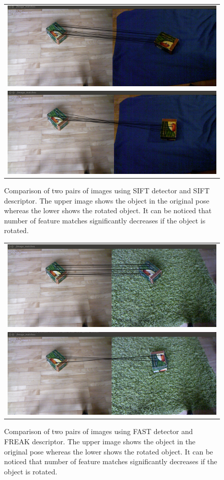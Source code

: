 \begin{figure}
    \begin{tabular}{c}
 

\includegraphics[width=0.7\columnwidth]{figures/sift-gpu-no-rotation.png}\\
\includegraphics[width=0.7\columnwidth]{figures/siftgpu-rotation.png}\\
    \end{tabular}


\caption{Comparison of two pairs of images using SIFT detector and SIFT descriptor. The upper image shows the object in the original pose whereas the lower shows the rotated object. It can be noticed that number of feature matches significantly decreases if the object is rotated. }
\label{fig:sift-features}
\end{figure}

\begin{figure}
    \begin{tabular}{c}
 

\includegraphics[width=0.7\columnwidth]{figures/freak-no-rotation.png}\\
\includegraphics[width=0.7\columnwidth]{figures/freak-rotation.png}\\
    \end{tabular}


\caption{Comparison of two pairs of images using FAST detector and FREAK descriptor. The upper image shows the object in the original pose whereas the lower shows the rotated object. It can be noticed that number of feature matches significantly decreases if the object is rotated. }
\label{fig:freak-features}
\end{figure}


